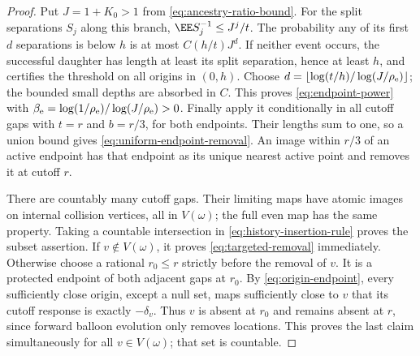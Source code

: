 \documentclass[11pt,letterpaper]{article}
\begin{document}
\begin{proof}
Put $J=1+K_0>1$ from \eqref{eq:ancestry-ratio-bound}.
For the split separations $S_j$ along this branch,
$\EE S_j^{-1}\le J^j/t$.
The probability any of its first $d$ separations is below $h$ is
at most $C(h/t)J^d$.
If neither event occurs, the successful daughter has length at least
its split separation, hence at least $h$, and certifies the threshold
on all origins in $(0,h)$.
Choose $d=\lfloor\log(t/h)/\log(J/\rho_{\rm e})\rfloor$;
the bounded small depths are absorbed in $C$.
This proves \eqref{eq:endpoint-power} with
$\beta_{\rm e}=\log(1/\rho_{\rm e})/\log(J/\rho_{\rm e})>0$.
Finally apply it conditionally in all cutoff gaps with $t=r$ and
$b=r/3$, for both endpoints. Their lengths sum to one, so a union
bound gives \eqref{eq:uniform-endpoint-removal}. An image within
$r/3$ of an active endpoint has that endpoint as its unique nearest
active point and removes it at cutoff $r$.

There are countably many cutoff gaps. Their limiting maps have atomic
images on internal collision vertices, all in $V(\omega)$; the full
even map has the same property. Taking a countable intersection in
\eqref{eq:history-insertion-rule} proves the subset assertion.
If $v\notin V(\omega)$, it proves \eqref{eq:targeted-removal}
immediately. Otherwise choose a rational $r_0\le r$ strictly before
the removal of $v$. It is a protected endpoint of both adjacent gaps
at $r_0$. By \eqref{eq:origin-endpoint}, every sufficiently close
origin, except a null set, maps sufficiently close to $v$ that its
cutoff response is exactly $-\delta_v$.
Thus $v$ is absent at $r_0$ and remains absent at $r$, since forward
balloon evolution only removes locations. This proves the last claim
simultaneously for all $v\in V(\omega)$; that set is countable.
\end{proof}
\end{document}
